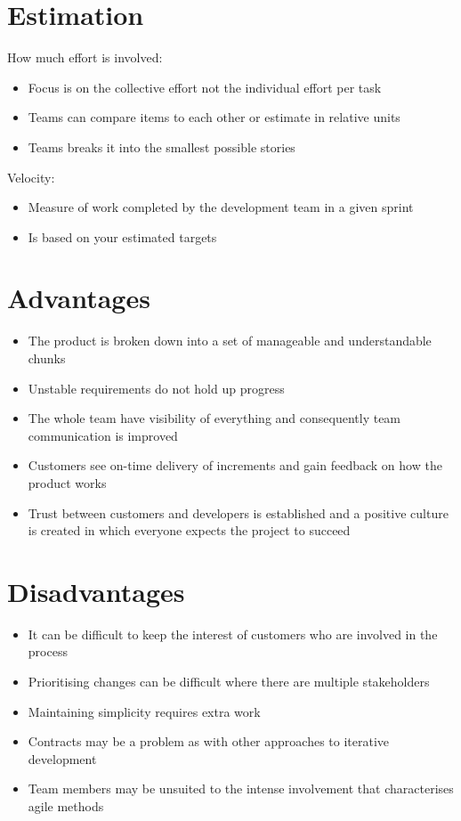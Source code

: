 \documentclass{article}[18pt]
\begin{document}
\section{Estimation}
How much effort is involved:
\begin{itemize}
	\item Focus is on the collective effort not the individual effort per task
	\item Teams can compare items to each other or estimate in relative units
	\item Teams breaks it into the smallest possible stories
\end{itemize}
Velocity:
\begin{itemize}
	\item Measure of work completed by the development team in a given sprint
	\item Is based on your estimated targets
\end{itemize}
\section{Advantages}
\begin{itemize}
	\item The product is broken down into a set of manageable and understandable chunks
	\item Unstable requirements do not hold up progress
	\item The whole team have visibility of everything and consequently team communication is improved
	\item Customers see on-time delivery of increments and gain feedback on how the product works
	\item Trust between customers and developers is established and a positive culture is created in which everyone expects the project to succeed
\end{itemize}
\section{Disadvantages}
\begin{itemize}
	\item It can be difficult to keep the interest of customers who are involved in the process
	\item Prioritising changes can be difficult where there are multiple stakeholders
	\item Maintaining simplicity requires extra work
	\item Contracts may be a problem as with other approaches to iterative development
	\item Team members may be unsuited to the intense involvement that characterises agile methods
\end{itemize}
\end{document}
